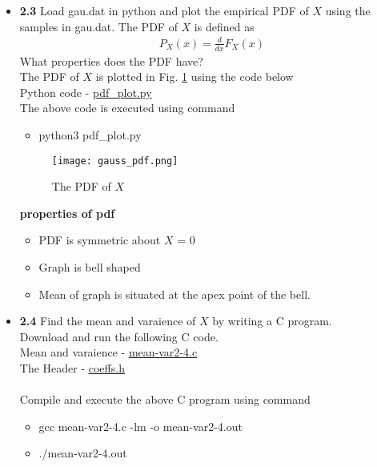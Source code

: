 \documentclass[journal,12pt,twocolumn]{IEEEtran}
\begin{document}
\begin{itemize}
    \item \textbf{2.3} Load gau.dat in python and plot the empirical PDF of $X$ using the samples in gau.dat. The PDF of $X$ is defined as 
    \begin{align}
        P_X(x) = \frac{d}{dx} F_X(x)
    \end{align}
    What properties does the PDF have? \\
    \solution The PDF of $X$ is plotted in Fig. \ref{fig:gauss_pdf}
    using the code below \\
    Python code - \href{https://github.com/jarpula-Bhanu/Random-numbers/blob/main/codes/pdf_plot.py}{pdf\_plot.py}\\
    The above code is executed using command
    \begin{itemize}
        \item python3 pdf\_plot.py \\
    \end{itemize}
    \begin{figure}[h]
        \centering
        \texttt{[image: gauss\_pdf.png]}
        \caption{The PDF of $X$}
        \label{fig:gauss_pdf}
    \end{figure}
    
    \textbf{properties of pdf}
    \begin{itemize}
        \item PDF is symmetric about $X$ = 0 
        \item Graph is bell shaped
        \item Mean of graph is situated at the apex point of the bell.\\
    \end{itemize}
    
    \item \textbf{2.4} Find the mean and varaience of $X$ by writing a C program.\\
     
    \solution Download and run the following C code.\\
    Mean and varaience - \href{https://github.com/jarpula-Bhanu/Random-numbers/blob/main/codes/mean-var2-4.c}{mean-var2-4.c}\\
    The Header - \href{https://github.com/jarpula-Bhanu/Random-numbers/blob/main/codes/coeffs.h}{coeffs.h} \\
    \\Compile and execute the above C program using command
    \begin{itemize}
        \item gcc mean-var2-4.c -lm -o mean-var2-4.out
        \item ./mean-var2-4.out \\
    \end{itemize} 
    

\end{itemize}
\end{document}
